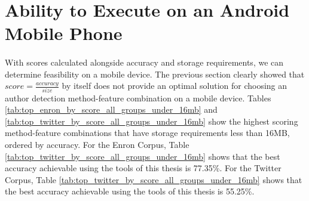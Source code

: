 \section{Ability to Execute on an Android Mobile Phone}
\paragraph*{} With scores calculated alongside accuracy and storage requirements, we can determine feasibility on a mobile device.  The previous section clearly showed that $score = \frac{accuracy}{size}$ by itself does not provide an optimal solution for choosing an author detection method-feature combination on a mobile device. Tables \ref{tab:top_enron_by_score_all_groups_under_16mb} and \ref{tab:top_twitter_by_score_all_groups_under_16mb} show the highest scoring method-feature combinations that have storage requirements less than 16MB, ordered by accuracy.  For the Enron Corpus, Table \ref{tab:top_twitter_by_score_all_groups_under_16mb} shows that the best accuracy achievable using the tools of this thesis is 77.35\%.  For the Twitter Corpus, Table \ref{tab:top_twitter_by_score_all_groups_under_16mb} shows that the best accuracy achievable using the tools of this thesis is 55.25\%. 

